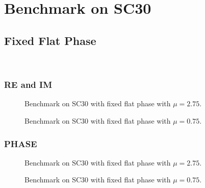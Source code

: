 \documentclass[../main.tex]{subfiles}
\begin{document}
\section{Benchmark on SC30}
\subsection{Fixed Flat Phase}\
\subsubsection{RE and IM}
\begin{figure}[H]
    \centering
    
    \caption{Benchmark on SC30 with fixed flat phase with $\mu = 2.75$.}
    \label{fig:sc30_fixed_flat_phase}
\end{figure}
\begin{figure}[H]
    \centering
    
    \caption{Benchmark on SC30 with fixed flat phase with $\mu = 0.75$.}
    \label{fig:sc30_fixed_flat_phase}
\end{figure}

\subsubsection{PHASE}
\begin{figure}[H]
    \centering
    
    \caption{Benchmark on SC30 with fixed flat phase with $\mu = 2.75$.}
    \label{fig:sc30_fixed_flat_phase}
\end{figure}
\begin{figure}[H]
    \centering
    
    \caption{Benchmark on SC30 with fixed flat phase with $\mu = 0.75$.}
    \label{fig:sc30_fixed_flat_phase}
\end{figure}
\end{document}
